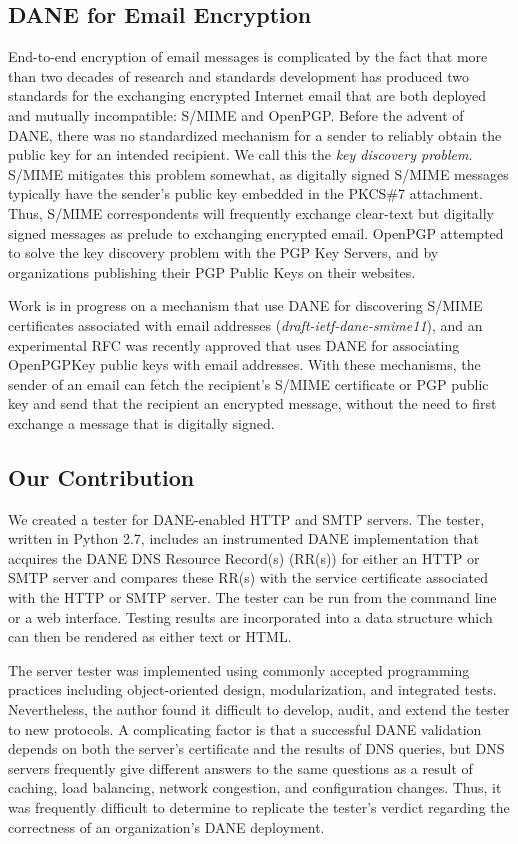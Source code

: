 \documentclass[preprint,3p,11pt]{elsarticle}
\begin{document}
\subsection{DANE for Email Encryption}

End-to-end encryption of email messages is complicated by the fact
that more than two decades of research and standards development
has produced two 
standards for the exchanging encrypted Internet email that are both
deployed and mutually incompatible:
S/MIME\cite{rfc5750} and OpenPGP\cite{rfc4880}. Before the advent of
DANE, there was no standardized mechanism for a sender to reliably obtain the
public key for an intended recipient. We call this the \emph{key
  discovery problem}. S/MIME mitigates this problem somewhat,
as digitally signed S/MIME messages typically have the sender's public
key embedded in the PKCS\#7 attachment\cite{rfc2315}. Thus, S/MIME
correspondents will frequently exchange clear-text but digitally
signed messages as prelude to exchanging encrypted email. OpenPGP
attempted to solve the key discovery problem with the PGP Key
Servers, and by organizations publishing their PGP Public Keys on
their websites. 

Work is in progress on a mechanism that use DANE for discovering S/MIME certificates
associated with email addresses (\emph{draft-ietf-dane-smime11}), and
an experimental RFC was recently approved that uses DANE for associating OpenPGPKey
public keys with email addresses\cite{rfc7929}. With these mechanisms,
the sender of an email can fetch the recipient's S/MIME certificate or
PGP public key and send that the recipient an encrypted message,
without the need to first exchange a message that is digitally signed.

\subsection{Our Contribution}

We created a tester for DANE-enabled HTTP and SMTP servers. The
tester, written in Python 2.7, includes an instrumented DANE
implementation that acquires the DANE DNS Resource Record(s) (RR(s)) for
either an HTTP or SMTP server and compares these RR(s) with the service
certificate associated with the HTTP or SMTP server. The tester can be run from
the command line or a web interface. Testing results are incorporated into
a data structure which can then be rendered as either text or HTML.

The server tester was implemented using commonly accepted
programming practices including object-oriented design,
modularization, and integrated tests. Nevertheless, the author found
it difficult to develop, audit, and extend the tester to new protocols. A 
complicating factor is that a successful DANE validation depends on both the server's certificate and the results of DNS
queries, but DNS servers frequently give different answers to the same
questions as a result of caching, load balancing, network congestion,
and configuration changes. Thus, it was frequently difficult to
determine to replicate the tester's verdict regarding the correctness
of an organization's DANE deployment.
\end{document}
